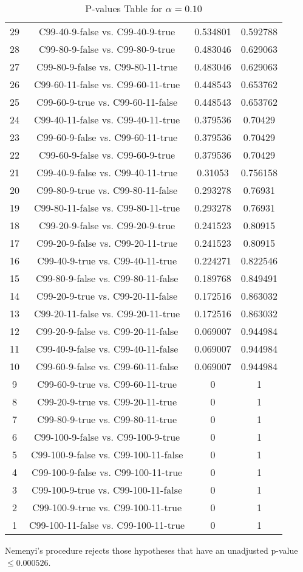 \documentclass[a4paper,10pt]{article}
\begin{document}
\begin{landscape}
\begin{table}[!htp]
\begin{tabular}{cccc}
29&C99-40-9-false vs. C99-40-9-true&0.534801&0.592788\\
28&C99-80-9-false vs. C99-80-9-true&0.483046&0.629063\\
27&C99-80-9-false vs. C99-80-11-true&0.483046&0.629063\\
26&C99-60-11-false vs. C99-60-11-true&0.448543&0.653762\\
25&C99-60-9-true vs. C99-60-11-false&0.448543&0.653762\\
24&C99-40-11-false vs. C99-40-11-true&0.379536&0.70429\\
23&C99-60-9-false vs. C99-60-11-true&0.379536&0.70429\\
22&C99-60-9-false vs. C99-60-9-true&0.379536&0.70429\\
21&C99-40-9-false vs. C99-40-11-true&0.31053&0.756158\\
20&C99-80-9-true vs. C99-80-11-false&0.293278&0.76931\\
19&C99-80-11-false vs. C99-80-11-true&0.293278&0.76931\\
18&C99-20-9-false vs. C99-20-9-true&0.241523&0.80915\\
17&C99-20-9-false vs. C99-20-11-true&0.241523&0.80915\\
16&C99-40-9-true vs. C99-40-11-true&0.224271&0.822546\\
15&C99-80-9-false vs. C99-80-11-false&0.189768&0.849491\\
14&C99-20-9-true vs. C99-20-11-false&0.172516&0.863032\\
13&C99-20-11-false vs. C99-20-11-true&0.172516&0.863032\\
12&C99-20-9-false vs. C99-20-11-false&0.069007&0.944984\\
11&C99-40-9-false vs. C99-40-11-false&0.069007&0.944984\\
10&C99-60-9-false vs. C99-60-11-false&0.069007&0.944984\\
9&C99-60-9-true vs. C99-60-11-true&0&1\\
8&C99-20-9-true vs. C99-20-11-true&0&1\\
7&C99-80-9-true vs. C99-80-11-true&0&1\\
6&C99-100-9-false vs. C99-100-9-true&0&1\\
5&C99-100-9-false vs. C99-100-11-false&0&1\\
4&C99-100-9-false vs. C99-100-11-true&0&1\\
3&C99-100-9-true vs. C99-100-11-false&0&1\\
2&C99-100-9-true vs. C99-100-11-true&0&1\\
1&C99-100-11-false vs. C99-100-11-true&0&1\\
\hline
\end{tabular}
\caption{P-values Table for $\alpha=0.10$}
\end{table}Nemenyi's procedure rejects those hypotheses that have an unadjusted p-value $\le0.000526$.


\end{landscape}
\end{document}
